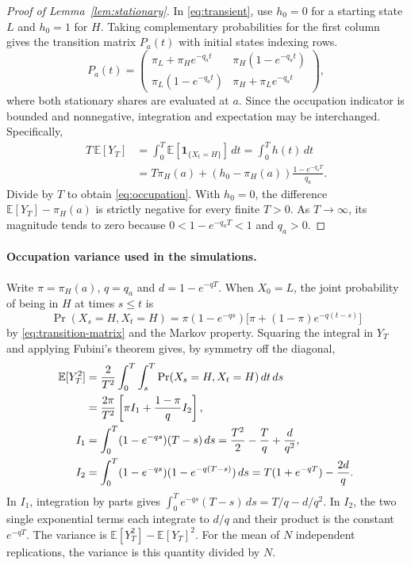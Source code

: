 \documentclass[11pt]{article}
\theoremstyle{definition}
\newcommand{\share}{\pi_H}
\begin{document}
\begin{proof}[Proof of Lemma~\ref{lem:stationary}]
In \eqref{eq:transient}, use $h_0=0$ for a starting state $L$ and
$h_0=1$ for $H$. Taking complementary probabilities for the first column
gives the transition matrix $P_a(t)$ with initial states indexing rows.
\begin{equation}\label{eq:transition-matrix}
 P_a(t)=
 \begin{pmatrix}
  \pi_L+\share e^{-q_at} & \share(1-e^{-q_at})\\
  \pi_L(1-e^{-q_at}) & \share+\pi_L e^{-q_at}
 \end{pmatrix},
\end{equation}
where both stationary shares are evaluated at $a$. Since the occupation
indicator is bounded and nonnegative, integration and expectation may
be interchanged. Specifically,
\begin{align*}
 T\,\mathbb E[Y_T]
 &=\int_0^T \mathbb E[\mathbf{1}_{\{X_t=H\}}]\,dt
   = \int_0^T h(t)\,dt\\
 &=T\share(a)+(h_0-\share(a))\frac{1-e^{-q_aT}}{q_a}.
\end{align*}
Divide by $T$ to obtain \eqref{eq:occupation}. With $h_0=0$, the
difference $\mathbb E[Y_T]-\share(a)$ is strictly negative for every
finite $T>0$. As $T\to\infty$, its magnitude tends to zero because
$0<1-e^{-q_aT}<1$ and $q_a>0$.
\end{proof}

\paragraph{Occupation variance used in the simulations.}
Write $\pi=\share(a)$, $q=q_a$ and $d=1-e^{-qT}$. When $X_0=L$,
the joint probability of being in $H$ at times $s\leq t$ is
\[
 \Pr(X_s=H,X_t=H)
 =\pi(1-e^{-qs})\big[\pi+(1-\pi)e^{-q(t-s)}\big]
\]
by \eqref{eq:transition-matrix} and the Markov property. Squaring the
integral in $Y_T$ and applying Fubini's theorem gives, by symmetry off
the diagonal,
\begin{align}
 \mathbb E[Y_T^2]
 &=\frac{2}{T^2}\int_0^T\int_s^T
      \Pr(X_s=H,X_t=H)\,dt\,ds \notag\\
 &=\frac{2\pi}{T^2}\left[\pi I_1+\frac{1-\pi}{q}I_2\right],\label{eq:occupation-second-moment}\\
 I_1&=\int_0^T (1-e^{-qs})(T-s)\,ds
       =\frac{T^2}{2}-\frac{T}{q}+\frac{d}{q^2},\notag\\
 I_2&=\int_0^T(1-e^{-qs})(1-e^{-q(T-s)})\,ds
       =T(1+e^{-qT})-\frac{2d}{q}.\notag
\end{align}
In $I_1$, integration by parts gives
$\int_0^T e^{-qs}(T-s)\,ds=T/q-d/q^2$.
In $I_2$, the two single exponential terms each integrate to $d/q$ and
their product is the constant $e^{-qT}$. The variance is
$\mathbb E[Y_T^2]-\mathbb E[Y_T]^2$. For the mean of $N$ independent
replications, the variance is this quantity divided by $N$.
\end{document}
